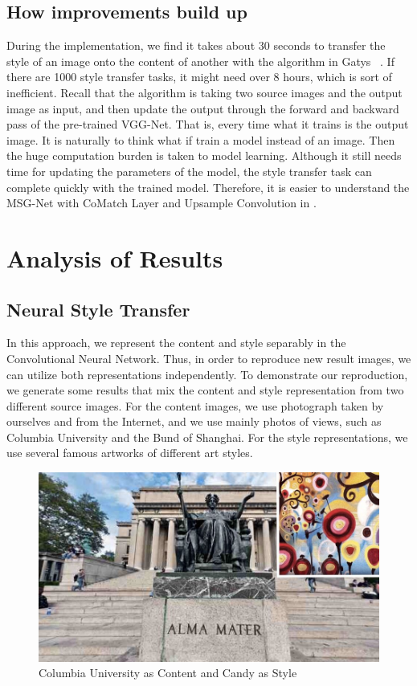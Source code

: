 \documentclass[10pt,twocolumn,letterpaper]{article}
\begin{document}
\subsection{How improvements build up}
During the implementation, we find it takes about 30 seconds to transfer the style of an image onto the content of another with the algorithm in Gatys \etal~\cite{Authors01}. If there are 1000 style transfer tasks, it might need over 8 hours, which is sort of inefficient. Recall that the algorithm is taking two source images and the output image as input, and then update the output through the forward and backward pass of the pre-trained VGG-Net. That is, every time what it trains is the output image. It is naturally to think what if train a model instead of an image. Then the huge computation burden is taken to model learning. Although it still needs time for updating the parameters of the model, the style transfer task can complete quickly with the trained model. Therefore, it is easier to understand the MSG-Net with CoMatch Layer and Upsample Convolution in \cite{Authors04}.


\section{Analysis of Results}


\subsection{Neural Style Transfer}

In this approach, we represent the content and style separably in the Convolutional Neural Network. Thus, in order to reproduce new result images, we can utilize both representations independently. To demonstrate our reproduction, we generate some results that mix the content and style representation from two different source images. For the content images, we use photograph taken by ourselves and from the Internet, and we use mainly photos of views, such as Columbia University and the Bund of Shanghai. For the style representations, we use  several famous artworks of different art styles.

\begin{figure}[t]
\begin{center}
\includegraphics[width=0.6\linewidth]{images/columbia.jpg}
\end{center}
\caption{Columbia University as Content and Candy as Style}
\label{fig:long}
\label{fig:onecol}
\label{fig_col_candy}
\end{figure}
\end{document}
